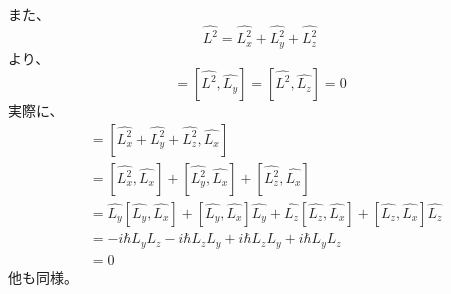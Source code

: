 また、
\begin{equation}
	\hat{L^2} = \hat{L_x^2} + \hat{L_y^2} + \hat{L_z^2}
\end{equation}
より、
\begin{equation}
	[\hat{L^2},\hat{L_x}] = [\hat{L^2},\hat{L_y}] = [\hat{L^2},\hat{L_z}] = 0
\end{equation}
実際に、
\begin{align}
	[\hat{L^2},\hat{L_x}]
	&= [\hat{L_x^2} + \hat{L_y^2} + \hat{L_z^2},\hat{L_x}] \\
	&= [\hat{L_x^2},\hat{L_x}] + [\hat{L_y^2},\hat{L_x}] + [\hat{L_z^2},\hat{L_x}] \\
	&= \hat{L_y}[\hat{L_y},\hat{L_x}] + [\hat{L_y},\hat{L_x}]\hat{L_y} + \hat{L_z}[\hat{L_z},\hat{L_x}] + [\hat{L_z},\hat{L_x}]\hat{L_z} \\
	&= -i\hbar L_yL_z -i\hbar L_zL_y + i\hbar L_zL_y + i\hbar L_yL_z \\
	&= 0
\end{align}
他も同様。
